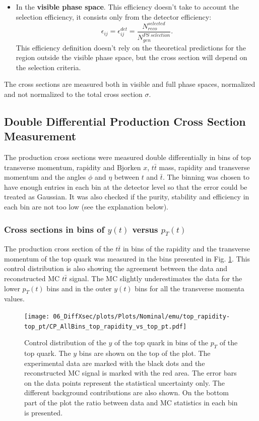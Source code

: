 \begin{itemize}
 \item In the \textbf{visible phase space}. This efficiency doesn't take to account the selection efficiency, it consists only from the detector efficiency:
 \begin{equation}
  \epsilon_{ij} = \epsilon_{ij}^{det} = \frac{N^{selected}_{reco}}{N^{PS\;selection}_{gen}}.
 \end{equation}
 This efficiency definition doesn't rely on the theoretical predictions for the region outside the visible phase space, but the cross section will depend on
 the selection criteria.
\end{itemize}

The cross sections are measured both in visible and full phase spaces, normalized and not normalized to the total cross section $\sigma$. 


\subsection{Double Differential Production Cross Section Measurement}

The production cross sections were measured double differentially in bins of top transverse momentum, rapidity and Bjorken $x$,
$t\bar{t}$ mass, rapidity and transverse momentum and the angles $\phi$ and $\eta$ between $t$ and $\bar{t}$.
The binning was chosen to have enough entries in each bin at the detector level so that the error could be treated as Gaussian.
It was also checked if the purity, stability and efficiency in each bin are not too low (see the explanation below).


\subsubsection{Cross sections in bins of $y(t)$ versus $p_{T}(t)$}

The production cross section of the $t\bar{t}$ in bins of the rapidity and the transverse momentum of the top quark was
measured in the bins presented in Fig. \ref{fig:CP_2D_y_pt}. This control distribution is also showing the agreement between 
the data and reconstructed MC $t\bar{t}$ signal. The MC slightly underestimates the data for the lower $p_{T}(t)$ bins and 
in the outer $y(t)$ bins for all the transverse momenta values.

\begin{figure}[t]
  \centering
  \texttt{[image: 06\_DiffXsec/plots/Plots/Nominal/emu/top\_rapidity-top\_pt/CP\_AllBins\_top\_rapidity\_vs\_top\_pt.pdf]}
  \caption{Control distribution of the $y$ of the top quark in bins of the $p_{T}$ of the top quark. The $y$ bins are shown on the top 
  of the plot. The experimental data are marked with the black dots and the reconstructed MC signal is marked with the red area. The error
  bars on the data points represent the statistical uncertainty only. The 
  different background contributions are also shown. On the bottom part of the plot the ratio between data and MC statistics in each bin
  is presented.}
  \label{fig:CP_2D_y_pt}
\end{figure}

